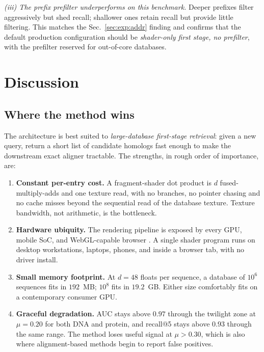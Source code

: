 \documentclass[twocolumn,11pt,a4paper]{article}
\theoremstyle{definition}
\theoremstyle{remark}
\begin{document}
\textit{(iii) The prefix prefilter underperforms on this benchmark.}
Deeper prefixes filter aggressively but shed recall; shallower ones
retain recall but provide little filtering. This matches the
Sec.~\ref{sec:exp:addr} finding and confirms that the default
production configuration should be \emph{shader-only first stage, no
prefilter}, with the prefilter reserved for out-of-core databases.

\section{Discussion}
\label{sec:discussion}

\subsection{Where the method wins}
\label{sec:discussion:wins}

The architecture is best suited to \emph{large-database first-stage
retrieval}: given a new query, return a short list of candidate homologs
fast enough to make the downstream exact aligner tractable. The strengths,
in rough order of importance, are:

\begin{enumerate}
    \item \textbf{Constant per-entry cost.} A fragment-shader dot product is
    $d$ fused-multiply-adds and one texture read, with no branches, no
    pointer chasing and no cache misses beyond the sequential read of the
    database texture. Texture bandwidth, not arithmetic, is the bottleneck.
    \item \textbf{Hardware ubiquity.} The rendering pipeline is exposed by
    every GPU, mobile SoC, and WebGL-capable browser
    \citep{webgl2,opengles3}. A single shader program runs on desktop
    workstations, laptops, phones, and inside a browser tab, with no driver
    install.
    \item \textbf{Small memory footprint.} At $d = 48$ floats per sequence,
    a database of $10^6$ sequences fits in $192$~MB; $10^8$ fits in
    $19.2$~GB. Either size comfortably fits on a contemporary consumer GPU.
    \item \textbf{Graceful degradation.} AUC stays above $0.97$ through the
    twilight zone at $\mu = 0.20$ for both DNA and protein, and recall@5
    stays above $0.93$ through the same range. The method loses useful
    signal at $\mu > 0.30$, which is also where alignment-based methods
    begin to report false positives.
\end{enumerate}
\end{document}
